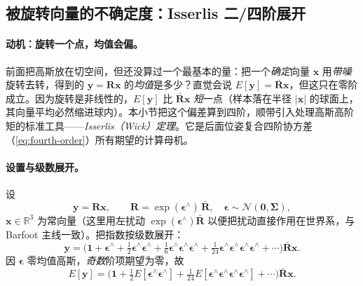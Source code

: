 \subsection{被旋转向量的不确定度：Isserlis 二/四阶展开}
\label{subsec:rotated-vector}

\paragraph{动机：旋转一个点，均值会偏。}前面把高斯放在切空间，但还没算过一个最基本的量：把一个\emph{确定}向量 $\mathbf{x}$ 用\emph{带噪}旋转去转，得到的 $\mathbf{y}=\mathbf{R}\mathbf{x}$ 的\emph{均值}是多少？直觉会说 $E[\mathbf{y}]=\bar{\mathbf{R}}\mathbf{x}$，但这只在零阶成立。因为旋转是非线性的，$E[\mathbf{y}]$ 比 $\bar{\mathbf{R}}\mathbf{x}$ \emph{短}一点（样本落在半径 $|\mathbf{x}|$ 的球面上，其向量平均必然缩进球内）。本小节把这个偏差算到四阶，顺带引入处理高斯高阶矩的标准工具——\emph{Isserlis（Wick）定理}。它是后面位姿复合四阶协方差（\cref{eq:fourth-order}）所有期望的计算母机。

\paragraph{设置与级数展开。}设
\begin{equation}
  \mathbf{y}=\mathbf{R}\mathbf{x},\qquad \mathbf{R}=\exp(\boldsymbol{\epsilon}^\wedge)\,\bar{\mathbf{R}},\quad \boldsymbol{\epsilon}\sim\mathcal{N}(\mathbf{0},\boldsymbol{\Sigma}),
  \label{eq:rotvec-setup}
\end{equation}
$\mathbf{x}\in\mathbb{R}^3$ 为常向量（这里用左扰动 $\exp(\boldsymbol{\epsilon}^\wedge)\bar{\mathbf{R}}$ 以便把扰动直接作用在世界系，与 Barfoot 主线一致\cite{barfoot2024state}）。把指数按级数展开：
\begin{equation}
  \mathbf{y}=\Big(\mathbf{1}+\boldsymbol{\epsilon}^\wedge+\tfrac12\boldsymbol{\epsilon}^\wedge\boldsymbol{\epsilon}^\wedge+\tfrac16\boldsymbol{\epsilon}^\wedge\boldsymbol{\epsilon}^\wedge\boldsymbol{\epsilon}^\wedge+\tfrac1{24}\boldsymbol{\epsilon}^\wedge\boldsymbol{\epsilon}^\wedge\boldsymbol{\epsilon}^\wedge\boldsymbol{\epsilon}^\wedge+\cdots\Big)\bar{\mathbf{R}}\mathbf{x}.
  \label{eq:rotvec-expand}
\end{equation}
因 $\boldsymbol{\epsilon}$ 零均值高斯，\emph{奇数}阶项期望为零，故
\begin{equation}
  E[\mathbf{y}]=\Big(\mathbf{1}+\tfrac12 E[\boldsymbol{\epsilon}^\wedge\boldsymbol{\epsilon}^\wedge]+\tfrac1{24}E[\boldsymbol{\epsilon}^\wedge\boldsymbol{\epsilon}^\wedge\boldsymbol{\epsilon}^\wedge\boldsymbol{\epsilon}^\wedge]+\cdots\Big)\bar{\mathbf{R}}\mathbf{x}.
  \label{eq:rotvec-mean-series}
\end{equation}

